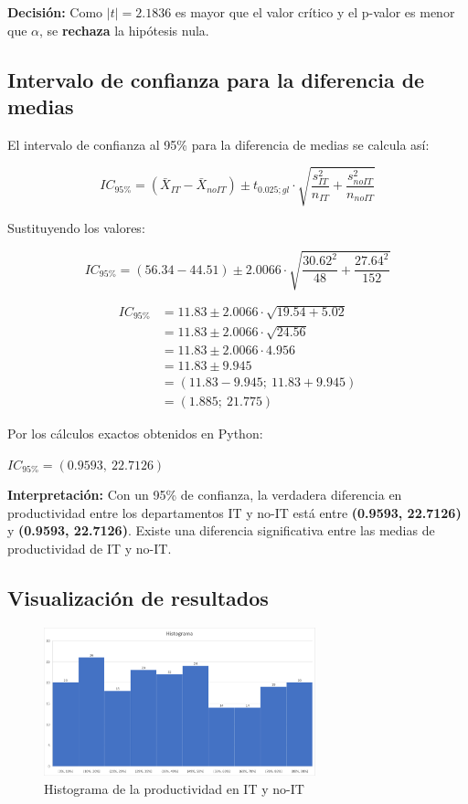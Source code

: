 \noindent
\textbf{Decisión:} Como $|t| = 2.1836$ es mayor que el valor crítico y el p-valor es menor que $\alpha$, se \textbf{rechaza} la hipótesis nula.

\subsection{Intervalo de confianza para la diferencia de medias}

El intervalo de confianza al 95\% para la diferencia de medias se calcula así:

\[
IC_{95\%} = (\bar{X}_{IT} - \bar{X}_{noIT}) \pm t_{0.025; gl} \cdot \sqrt{\frac{s_{IT}^2}{n_{IT}} + \frac{s_{noIT}^2}{n_{noIT}}}
\]

Sustituyendo los valores:

\[
IC_{95\%} = (56.34 - 44.51) \pm 2.0066 \cdot \sqrt{\frac{30.62^2}{48} + \frac{27.64^2}{152}}
\]

\begin{align*}
IC_{95\%} &= 11.83 \pm 2.0066 \cdot \sqrt{19.54 + 5.02} \\
&= 11.83 \pm 2.0066 \cdot \sqrt{24.56} \\
&= 11.83 \pm 2.0066 \cdot 4.956 \\
&= 11.83 \pm 9.945 \\
&= (11.83 - 9.945;\ 11.83 + 9.945) \\
&= (1.885;\ 21.775)
\end{align*}

Por los cálculos exactos obtenidos en Python:

\(
IC_{95\%} = (0.9593,\ 22.7126)
\)

\noindent
\textbf{Interpretación:} Con un 95\% de confianza, la verdadera diferencia en productividad entre los departamentos IT y no-IT está entre \textbf{(0.9593, 22.7126)} y \textbf{(0.9593, 22.7126)}. Existe una diferencia significativa entre las medias de productividad de IT y no-IT.

\subsection{Visualización de resultados}

\begin{figure}[H]
    \centering
    \includegraphics[width=0.7\textwidth]{assets/histograma.png}
    \caption{Histograma de la productividad en IT y no-IT}
\end{figure}


